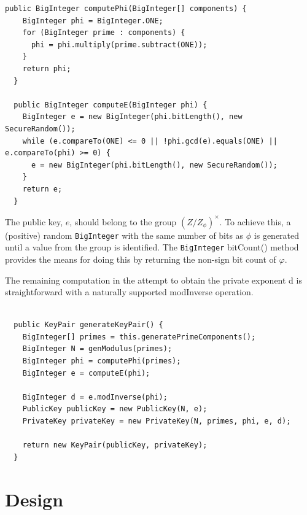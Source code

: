 \documentclass[]{final_report}
\theoremstyle{definition}
\begin{document}
\begin{lstlisting}[caption=Key components]
  public BigInteger computePhi(BigInteger[] components) {
    BigInteger phi = BigInteger.ONE;
    for (BigInteger prime : components) {
      phi = phi.multiply(prime.subtract(ONE));
    }
    return phi;
  }
  
  public BigInteger computeE(BigInteger phi) {
    BigInteger e = new BigInteger(phi.bitLength(), new SecureRandom());
    while (e.compareTo(ONE) <= 0 || !phi.gcd(e).equals(ONE) || e.compareTo(phi) >= 0) {
      e = new BigInteger(phi.bitLength(), new SecureRandom());
    }
    return e;
  }
\end{lstlisting}
The public key, \( e \), should belong to the group \( (Z/ Z_{\phi})^{\times} \). To achieve this, a (positive) random \texttt{BigInteger} with the same number of bits as \( \phi \) is generated until a value from the group is identified. The \texttt{BigInteger} bitCount() method provides the means for doing this by returning the non-sign bit count of $\varphi$. 

The remaining computation in the attempt to obtain the private exponent d is straightforward with a naturally supported modInverse operation.
\begin{lstlisting}[caption=Java Implementation of Key Generation (\ref{subSec:keygen})]
  
  public KeyPair generateKeyPair() {
    BigInteger[] primes = this.generatePrimeComponents();
    BigInteger N = genModulus(primes);
    BigInteger phi = computePhi(primes);
    BigInteger e = computeE(phi);
    
    BigInteger d = e.modInverse(phi);
    PublicKey publicKey = new PublicKey(N, e);
    PrivateKey privateKey = new PrivateKey(N, primes, phi, e, d);

    return new KeyPair(publicKey, privateKey);
  }

\end{lstlisting}

\section{Design}
\end{document}
